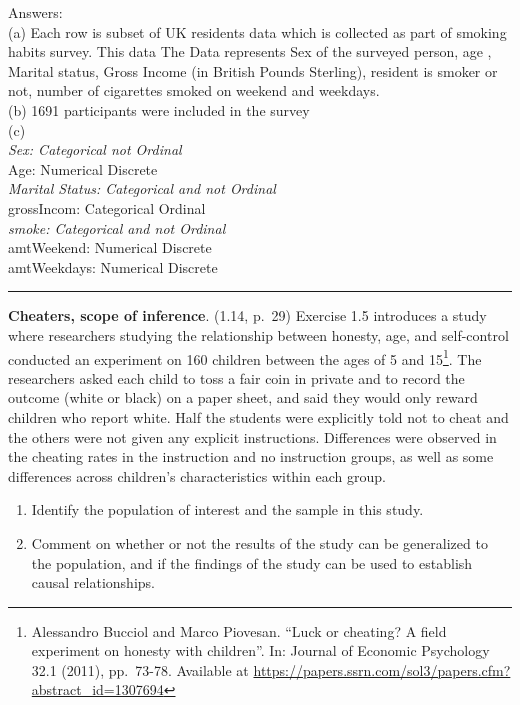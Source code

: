 \documentclass[
]{article}
\providecommand{\tightlist}{%
  \setlength{\itemsep}{0pt}\setlength{\parskip}{0pt}}
\begin{document}
Answers:\\
(a) Each row is subset of UK residents data which is collected as part
of smoking habits survey. This data The Data represents Sex of the
surveyed person, age , Marital status, Gross Income (in British Pounds
Sterling), resident is smoker or not, number of cigarettes smoked on
weekend and weekdays.\\
(b) 1691 participants were included in the survey\\
(c)\\
\emph{Sex: Categorical not Ordinal\\
}Age: Numerical Discrete\\
\emph{Marital Status: Categorical and not Ordinal\\
}grossIncom: Categorical Ordinal\\
\emph{smoke: Categorical and not Ordinal\\
}amtWeekend: Numerical Discrete\\
amtWeekdays: Numerical Discrete

\begin{center}\rule{0.5\linewidth}{0.5pt}\end{center}

\clearpage

\textbf{Cheaters, scope of inference}. (1.14, p.~29) Exercise 1.5
introduces a study where researchers studying the relationship between
honesty, age, and self-control conducted an experiment on 160 children
between the ages of 5 and 15\footnote{Alessandro Bucciol and Marco
  Piovesan. ``Luck or cheating? A field experiment on honesty with
  children''. In: Journal of Economic Psychology 32.1 (2011), pp.~73-78.
  Available at
  \url{https://papers.ssrn.com/sol3/papers.cfm?abstract_id=1307694}}.
The researchers asked each child to toss a fair coin in private and to
record the outcome (white or black) on a paper sheet, and said they
would only reward children who report white. Half the students were
explicitly told not to cheat and the others were not given any explicit
instructions. Differences were observed in the cheating rates in the
instruction and no instruction groups, as well as some differences
across children's characteristics within each group.

\begin{enumerate}
\def\labelenumi{(\alph{enumi})}
\tightlist
\item
  Identify the population of interest and the sample in this study.
\item
  Comment on whether or not the results of the study can be generalized
  to the population, and if the findings of the study can be used to
  establish causal relationships.
\end{enumerate}
\end{document}
